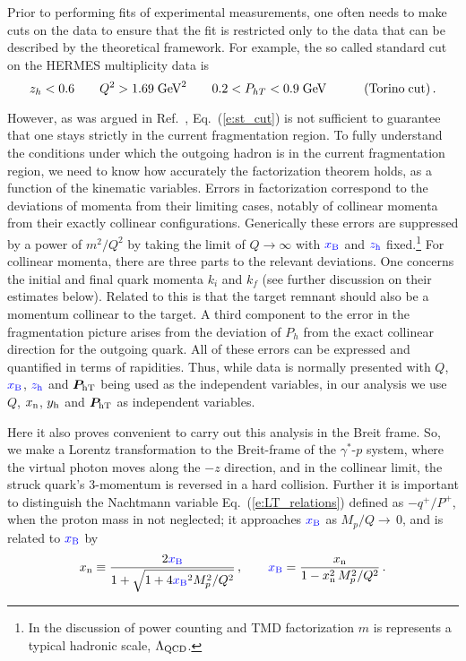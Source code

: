 \documentclass[final,3p,times,onecolumn,sort&compress,hidelinks]{elsarticle}
\newcommand{\xbj}{\ensuremath{{\cbl x_{\rm B}}}}
\newcommand{\xn}{\ensuremath{x_{\rm n}}}
\newcommand{\zh}{\ensuremath{{\cbl z_{\rm h}}}}
\newcommand{\hady}{\ensuremath{y_{\rm h}}}
\newcommand{\T}[2]{\boldsymbol{#1}_{#2\text{T}}}
\newcommand\3[1]{\boldsymbol{#1}}
\newcommand{\crd}{\color{red}}
\newcommand{\cbl}{\color{blue}}
\begin{document}
Prior to performing  fits of  experimental measurements, one often needs to make cuts on the data to ensure that the fit is restricted only to the data that can be described by the theoretical  framework.  For example, the so called standard cut on the HERMES multiplicity data is~\cite{Anselmino:2013lza}
\begin{equation}
z_h < 0.6 \quad\quad Q^2 > 1.69 \; \textrm{GeV}^2  
\quad\quad 0.2 < P_{hT} < 0.9 \; \textrm{GeV} \quad\quad\quad{\rm (Torino\;cut)}\,.\label{e:st_cut}
\end{equation}
{\crd However, as was argued in Ref.~\cite{Boglione:2016bph}, Eq.~(\ref{e:st_cut}) is not sufficient to guarantee that one stays strictly in the current fragmentation region. To fully understand the conditions under which the outgoing hadron is in the current fragmentation region, we need to know how accurately the factorization theorem holds, as a function of the kinematic variables.
Errors in factorization correspond to the deviations of momenta
from their limiting cases, notably of collinear momenta from their
exactly collinear configurations.  Generically these errors are suppressed
by a power of $m^2/Q^2$ by taking the limit of $Q\rightarrow \infty$ with $\xbj$ and $\zh$ fixed.\footnote{In the discussion of power counting and TMD factorization $m$ is
  represents a typical hadronic scale, $\Lambda_{\rm QCD}$.}  For collinear momenta, there are
three parts to the relevant deviations.
One concerns the initial and final
quark momenta $k_i$ and $k_f$ (see further discussion on their estimates below).
 Related to this is that the target remnant should also be a momentum collinear to the target.   A third component to the error in the fragmentation picture arises from the deviation of $P_h$ from the exact collinear direction for the outgoing quark. All of these errors can be expressed and quantified  in terms of rapidities. Thus,  while data is normally presented with $Q$, $\xbj$, $\zh$ and $\T{P}{\rm h}$ being used as the independent variables, in our analysis we 
 use $Q$, $\xn$, $\hady$ and $\T{P}{\rm h}$ as independent variables.

 Here it also proves convenient to carry out this analysis in the Breit frame.
 So, we make a Lorentz transformation to  the Breit-frame of the  $\gamma^*$-$p$
 system, where the virtual photon moves along the $-z$ direction, and in the collinear limit, the struck quark's $3$-momentum is reversed in a hard collision.
  Further it is important to distinguish the Nachtmann variable Eq.~(\ref{e:LT_relations}) defined as $-q^+/P^+$, when the proton mass in not neglected; it approaches $\xbj$ as $M_p/Q\rightarrow\, 0$, and is related to $\xbj$ by
\begin{equation}
 \xn \equiv \frac{2 \xbj}{1 + \sqrt{1 + 4 \xbj^2 M_p^2/Q^2} }\,,
 \qquad 
 \xbj = \frac{\xn}{1 - \xn^2\,M_p^2/Q^2 }\, .
\label{eq:xn.xbj}
\end{equation}


}
\end{document}

